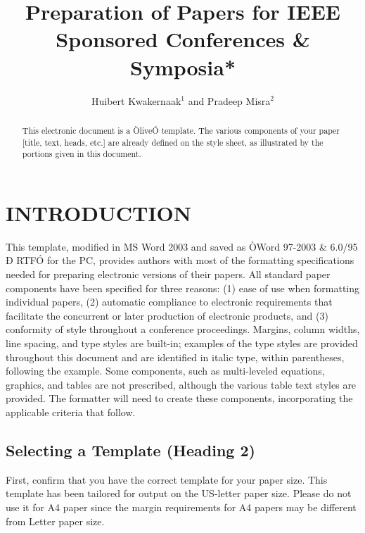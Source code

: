 \documentclass[a4paper, 10pt, conference]{ieeeconf}      %
\title{\LARGE \bf
Preparation of Papers for IEEE Sponsored Conferences \& Symposia*
}
\author{Huibert Kwakernaak$^{1}$ and Pradeep Misra$^{2}$%
}
\begin{document}
\maketitle
\thispagestyle{empty}
\pagestyle{empty}


\begin{abstract}

This electronic document is a ÒliveÓ template. The various components of your paper [title, text, heads, etc.] are already defined on the style sheet, as illustrated by the portions given in this document.

\end{abstract}


\section{INTRODUCTION}

This template, modified in MS Word 2003 and saved as ÒWord 97-2003 \& 6.0/95 Ð RTFÓ for the PC, provides authors with most of the formatting specifications needed for preparing electronic versions of their papers. All standard paper components have been specified for three reasons: (1) ease of use when formatting individual papers, (2) automatic compliance to electronic requirements that facilitate the concurrent or later production of electronic products, and (3) conformity of style throughout a conference proceedings. Margins, column widths, line spacing, and type styles are built-in; examples of the type styles are provided throughout this document and are identified in italic type, within parentheses, following the example. Some components, such as multi-leveled equations, graphics, and tables are not prescribed, although the various table text styles are provided. The formatter will need to create these components, incorporating the applicable criteria that follow.

\subsection{Selecting a Template (Heading 2)}

First, confirm that you have the correct template for your paper size. This template has been tailored for output on the US-letter paper size. Please do not use it for A4 paper since the margin requirements for A4 papers may be different from Letter paper size.
\end{document}
